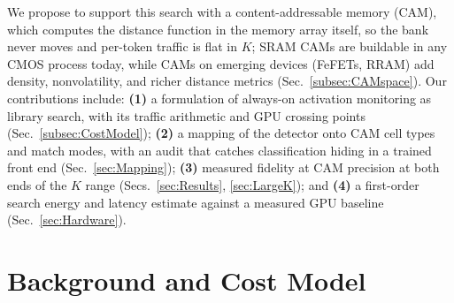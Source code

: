 \documentclass[conference]{IEEEtran}
\newcommand{\cam}{{CAM}\xspace}
\newcommand{\fefets}{{FeFETs}\xspace}
\begin{document}
We propose to support this search with a content-addressable memory
(\cam), which computes the distance function in the memory array
itself, so the bank never moves and per-token traffic is flat in
$K$; SRAM \cam{}s are buildable in any CMOS process today, while
\cam{}s on emerging devices (\fefets, RRAM) add density,
nonvolatility, and richer distance metrics
(Sec.~\ref{subsec:CAMspace}). Our contributions include: {\bf (1)} a
formulation of always-on activation monitoring as library search,
with its traffic arithmetic and GPU crossing points
(Sec.~\ref{subsec:CostModel}); {\bf (2)} a mapping of the detector
onto \cam cell types and match modes, with an audit that catches
classification hiding in a trained front end
(Sec.~\ref{sec:Mapping}); {\bf (3)} measured fidelity at \cam
precision at both ends of the $K$ range (Secs.~\ref{sec:Results},
\ref{sec:LargeK}); and {\bf (4)} a first-order search energy and
latency estimate against a measured GPU baseline
(Sec.~\ref{sec:Hardware}).

\section{Background and Cost Model}
\label{sec:Background}
\end{document}
